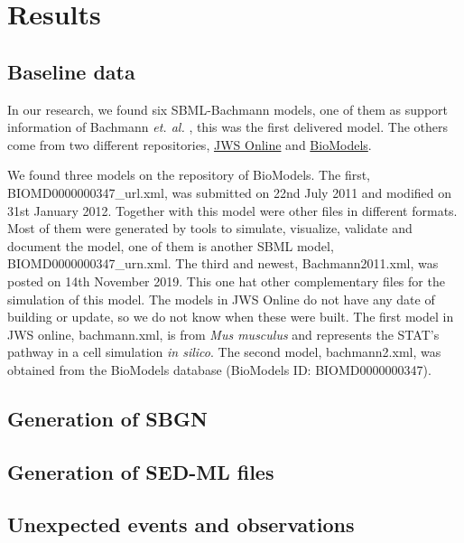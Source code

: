 \section*{Results} \label{resuslt}
\subsection*{Baseline data}
In our research, we found six SBML-Bachmann models, one of them as support information of Bachmann \textit{et. al.} \cite{bachmannmodel}, this was the first delivered model. The others come from two different repositories, \hyperlink{https://www.systemsmedicine.net/posts/jws-online-biological-systems-modelling}{JWS Online} and \hyperlink{https://www.ebi.ac.uk/biomodels/}{BioModels}.

We found three models on the repository of BioModels. The first, \textsf{BIOMD0000000347\_url.xml}, was submitted on 22nd July 2011 and modified on 31st January 2012. Together with this model were other files in different formats. Most of them were generated by tools to simulate, visualize, validate and document the model, one of them is another SBML model, \textsf{BIOMD0000000347\_urn.xml}. The third and newest, Bachmann2011.xml, was posted on 14th November 2019. This one hat other complementary files for the simulation of this model. The models in JWS Online do not have any date of building or update, so we do not know when these were built. The first model in JWS online, bachmann.xml, is from \textit{Mus musculus} and represents the STAT's pathway in a cell simulation \textit{in silico}. The second model, \textsf{bachmann2.xml}, was obtained from the BioModels database (BioModels ID: BIOMD0000000347).

\subsection*{Generation of SBGN}

\subsection*{Generation of SED-ML files}

\subsection*{Unexpected events and observations}
